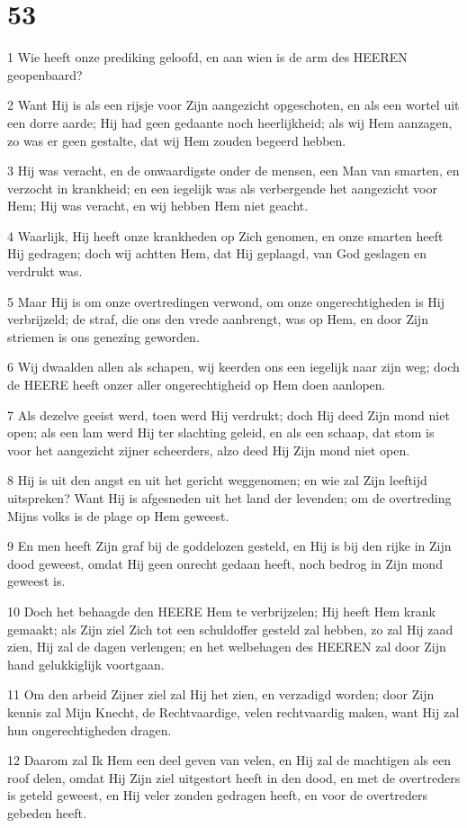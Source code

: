 \chapter{53}

\par 1 Wie heeft onze prediking geloofd, en aan wien is de arm des HEEREN geopenbaard?
\par 2 Want Hij is als een rijsje voor Zijn aangezicht opgeschoten, en als een wortel uit een dorre aarde; Hij had geen gedaante noch heerlijkheid; als wij Hem aanzagen, zo was er geen gestalte, dat wij Hem zouden begeerd hebben.
\par 3 Hij was veracht, en de onwaardigste onder de mensen, een Man van smarten, en verzocht in krankheid; en een iegelijk was als verbergende het aangezicht voor Hem; Hij was veracht, en wij hebben Hem niet geacht.
\par 4 Waarlijk, Hij heeft onze krankheden op Zich genomen, en onze smarten heeft Hij gedragen; doch wij achtten Hem, dat Hij geplaagd, van God geslagen en verdrukt was.
\par 5 Maar Hij is om onze overtredingen verwond, om onze ongerechtigheden is Hij verbrijzeld; de straf, die ons den vrede aanbrengt, was op Hem, en door Zijn striemen is ons genezing geworden.
\par 6 Wij dwaalden allen als schapen, wij keerden ons een iegelijk naar zijn weg; doch de HEERE heeft onzer aller ongerechtigheid op Hem doen aanlopen.
\par 7 Als dezelve geeist werd, toen werd Hij verdrukt; doch Hij deed Zijn mond niet open; als een lam werd Hij ter slachting geleid, en als een schaap, dat stom is voor het aangezicht zijner scheerders, alzo deed Hij Zijn mond niet open.
\par 8 Hij is uit den angst en uit het gericht weggenomen; en wie zal Zijn leeftijd uitspreken? Want Hij is afgesneden uit het land der levenden; om de overtreding Mijns volks is de plage op Hem geweest.
\par 9 En men heeft Zijn graf bij de goddelozen gesteld, en Hij is bij den rijke in Zijn dood geweest, omdat Hij geen onrecht gedaan heeft, noch bedrog in Zijn mond geweest is.
\par 10 Doch het behaagde den HEERE Hem te verbrijzelen; Hij heeft Hem krank gemaakt; als Zijn ziel Zich tot een schuldoffer gesteld zal hebben, zo zal Hij zaad zien, Hij zal de dagen verlengen; en het welbehagen des HEEREN zal door Zijn hand gelukkiglijk voortgaan.
\par 11 Om den arbeid Zijner ziel zal Hij het zien, en verzadigd worden; door Zijn kennis zal Mijn Knecht, de Rechtvaardige, velen rechtvaardig maken, want Hij zal hun ongerechtigheden dragen.
\par 12 Daarom zal Ik Hem een deel geven van velen, en Hij zal de machtigen als een roof delen, omdat Hij Zijn ziel uitgestort heeft in den dood, en met de overtreders is geteld geweest, en Hij veler zonden gedragen heeft, en voor de overtreders gebeden heeft.

